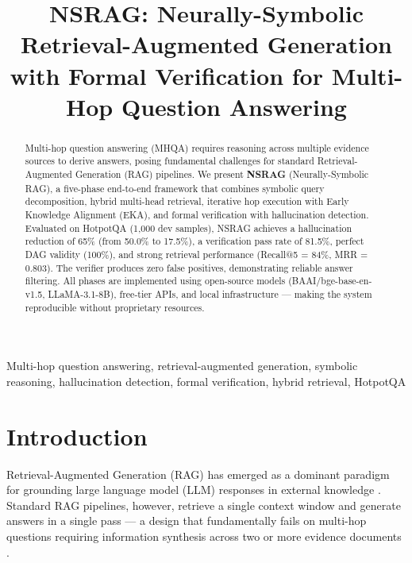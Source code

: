 \documentclass[conference]{IEEEtran}
\begin{document}
\title{NSRAG: Neurally-Symbolic Retrieval-Augmented Generation\\
with Formal Verification for Multi-Hop Question Answering}

\author{
}

\maketitle

\begin{abstract}
Multi-hop question answering (MHQA) requires reasoning across multiple evidence sources to derive answers, posing fundamental challenges for standard Retrieval-Augmented Generation (RAG) pipelines. We present \textbf{NSRAG} (Neurally-Symbolic RAG), a five-phase end-to-end framework that combines symbolic query decomposition, hybrid multi-head retrieval, iterative hop execution with Early Knowledge Alignment (EKA), and formal verification with hallucination detection. Evaluated on HotpotQA (1{,}000 dev samples), NSRAG achieves a hallucination reduction of 65\% (from 50.0\% to 17.5\%), a verification pass rate of 81.5\%, perfect DAG validity (100\%), and strong retrieval performance (Recall@5 = 84\%, MRR = 0.803). The verifier produces zero false positives, demonstrating reliable answer filtering. All phases are implemented using open-source models (BAAI/bge-base-en-v1.5, LLaMA-3.1-8B), free-tier APIs, and local infrastructure — making the system reproducible without proprietary resources.
\end{abstract}

\begin{IEEEkeywords}
Multi-hop question answering, retrieval-augmented generation, symbolic reasoning, hallucination detection, formal verification, hybrid retrieval, HotpotQA
\end{IEEEkeywords}

\section{Introduction}

Retrieval-Augmented Generation (RAG) has emerged as a dominant paradigm for grounding large language model (LLM) responses in external knowledge \cite{lewis2020rag}. Standard RAG pipelines, however, retrieve a single context window and generate answers in a single pass — a design that fundamentally fails on multi-hop questions requiring information synthesis across two or more evidence documents \cite{yang2018hotpotqa}.
\end{document}
